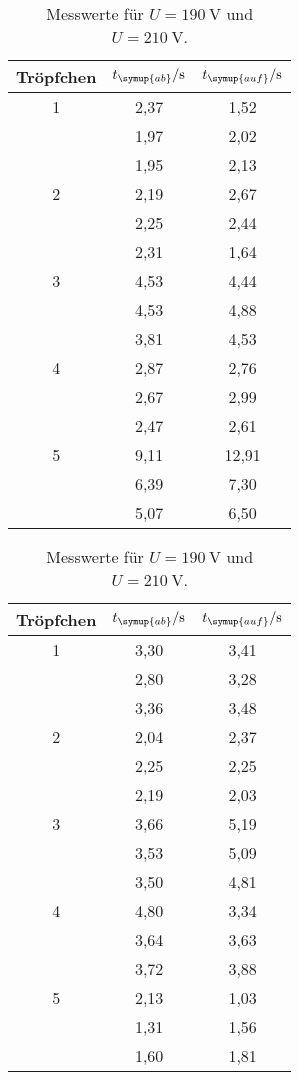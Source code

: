 \begin{table}
  \centering
  \caption{Messwerte für $U=\SI{190}{\volt}$ und
  $U=\SI{210}{\volt}$.}
  \label{tab:t34}
  \begin{tabular}{c c c}
    \toprule
    Tröpfchen & $t_{\symup{ab}}/\unit{\second}$ & $t_{\symup{auf}}/\unit{\second}$ \\
    \midrule
    1 & 2,37 &  1,52 \\
      & 1,97 &  2,02 \\
      & 1,95 &  2,13 \\
    2 & 2,19 &  2,67 \\
      & 2,25 &  2,44 \\
      & 2,31 &  1,64 \\
    3 & 4,53 &  4,44 \\
      & 4,53 &  4,88 \\
      & 3,81 &  4,53 \\
    4 & 2,87 &  2,76 \\
      & 2,67 &  2,99 \\
      & 2,47 &  2,61 \\
    5 & 9,11 & 12,91 \\
      & 6,39 &  7,30  \\
      & 5,07 &  6,50  \\
    \bottomrule
  \end{tabular}
  \quad
  \begin{tabular}{c c c}
    \toprule
    Tröpfchen & $t_{\symup{ab}}/\unit{\second}$ & $t_{\symup{auf}}/\unit{\second}$ \\
    \midrule
    1 & 3,30 & 3,41 \\
      & 2,80 & 3,28 \\
      & 3,36 & 3,48 \\
    2 & 2,04 & 2,37 \\
      & 2,25 & 2,25 \\
      & 2,19 & 2,03 \\
    3 & 3,66 & 5,19 \\
      & 3,53 & 5,09 \\
      & 3,50 & 4,81 \\
    4 & 4,80 & 3,34 \\
      & 3,64 & 3,63 \\
      & 3,72 & 3,88 \\
    5 & 2,13 & 1,03 \\
      & 1,31 & 1,56 \\
      & 1,60 & 1,81 \\
    \bottomrule
  \end{tabular}
\end{table}


